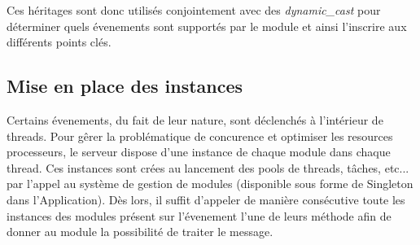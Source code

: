     Ces héritages sont donc utilisés conjointement avec des \textit{dynamic\_cast} pour déterminer quels évenements sont supportés par le module et ainsi l'inscrire aux différents points clés. 

    \subsection{Mise en place des instances}
    Certains évenements, du fait de leur nature, sont déclenchés à l'intérieur de threads. Pour gêrer la problématique de concurence et optimiser les resources processeurs, le serveur dispose d'une instance de chaque module dans chaque thread.
    Ces instances sont crées au lancement des pools de threads, tâches, etc... par l'appel au système de gestion de modules (disponible sous forme de Singleton dans l'Application).
    Dès lors, il suffit d'appeler de manière consécutive toute les instances des modules présent sur l'évenement l'une de leurs méthode afin de donner au module la possibilité de traiter le message.
